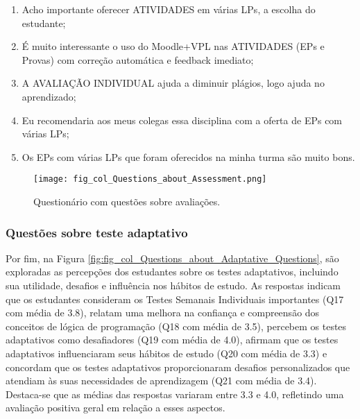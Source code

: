 \begin{enumerate}[label=\textbf{Q\arabic*.}, itemsep=0pt, parsep=0pt, topsep=0pt, leftmargin=*, before=\ttfamily, after=\normalfont]
    \fontsize{9}{11}\selectfont
    \setcounter{enumi}{11} %
    \item Acho importante oferecer ATIVIDADES em várias LPs, a escolha do estudante;
    \item É muito interessante o uso do Moodle+VPL nas ATIVIDADES (EPs e Provas) com correção automática e feedback imediato;
    \item A AVALIAÇÃO INDIVIDUAL ajuda a diminuir plágios, logo ajuda no aprendizado;
    \item Eu recomendaria aos meus colegas essa disciplina com a oferta de EPs com várias LPs;
    \item Os EPs com várias LPs que foram oferecidos na minha turma são muito bons.
\end{enumerate}

\begin{figure}[!ht]
    \centering
    \texttt{[image: fig\_col\_Questions\_about\_Assessment.png]}
     \caption{Questionário com questões sobre avaliações.}
  \label{fig:fig_col_Questions_about_Assessment}
\end{figure}

\subsubsection{Questões sobre teste adaptativo}

Por fim, na Figura \ref{fig:fig_col_Questions_about_Adaptative_Questions}, são exploradas as percepções dos estudantes sobre os testes adaptativos, incluindo sua utilidade, desafios e influência nos hábitos de estudo. As respostas indicam que os estudantes consideram os Testes Semanais Individuais importantes (Q17 com média de 3.8), relatam uma melhora na confiança e compreensão dos conceitos de lógica de programação (Q18 com média de 3.5), percebem os testes adaptativos como desafiadores (Q19 com média de 4.0), afirmam que os testes adaptativos influenciaram seus hábitos de estudo (Q20 com média de 3.3) e concordam que os testes adaptativos proporcionaram desafios personalizados que atendiam às suas necessidades de aprendizagem (Q21 com média de 3.4). Destaca-se que as médias das respostas variaram entre 3.3 e 4.0, refletindo uma avaliação positiva geral em relação a esses aspectos. 

